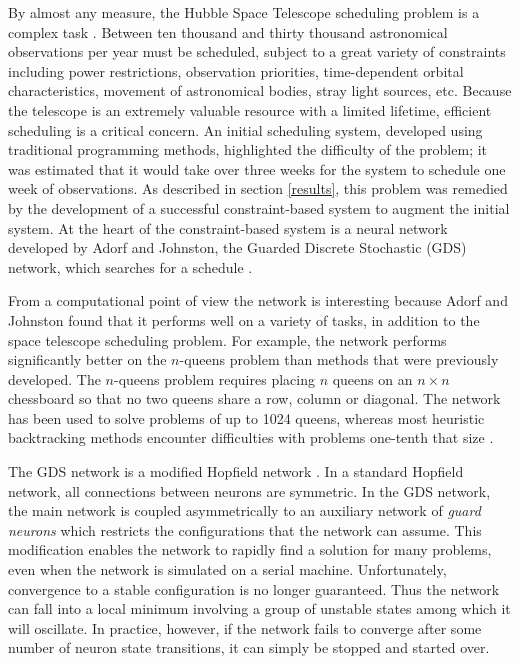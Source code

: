 \documentclass[twoside,12pt,titlepage,a4paper]{article}
\begin{document}
By almost any measure, the Hubble Space Telescope scheduling problem
is a complex task \cite{mj-early,sam}.
Between ten thousand and thirty thousand 
astronomical observations per year must be scheduled,
subject to a great
variety of constraints including
power restrictions, observation priorities,  
time-dependent orbital characteristics, 
movement of astronomical bodies, stray
light sources, etc. Because the telescope is an extremely
valuable resource with a limited lifetime, efficient scheduling
is a critical concern. An initial scheduling system, developed
using traditional programming methods,
highlighted the difficulty of the problem;
it was estimated that it would take over three
weeks for the system to schedule one
week of observations. As described in section \ref{results},
this problem was remedied by 
the development
of a successful constraint-based system to augment the initial system.
At the heart of the constraint-based system
is a neural network developed by Adorf and Johnston, 
the Guarded Discrete Stochastic (GDS) network,
which searches for a schedule \cite{adorf,johnston}.

From a computational point of view the network is interesting because
Adorf and Johnston found that it performs well on a variety of tasks,
in addition to the space telescope scheduling problem. For example,
the network performs significantly better on the $n$-queens problem
than methods that were previously developed.  The $n$-queens problem
requires placing $n$ queens on an $n \times n$ chessboard so that no
two queens share a row, column or diagonal.  The network has been used
to solve problems of up to 1024 queens, whereas most heuristic
backtracking methods encounter difficulties with problems one-tenth
that size \cite{stones}.

The GDS network is a modified Hopfield network \cite{hopfield}. 
In a standard Hopfield network, all connections between neurons are
symmetric. In the GDS network, the main network is coupled
asymmetrically to an auxiliary network of {\em guard neurons} which
restricts the configurations that the network can assume.  This
modification enables the network to rapidly find a solution for many
problems, even when the network is simulated on a serial machine.  
Unfortunately, convergence to a stable configuration is no
longer guaranteed.  Thus the network can fall into a local minimum
involving a group of unstable states among which it will oscillate.
In practice, however, if the network fails to converge after some
number of neuron state transitions, it can simply be stopped and
started over.
\end{document}
